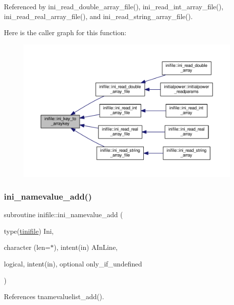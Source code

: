 Referenced by ini\+\_\+read\+\_\+double\+\_\+array\+\_\+file(), ini\+\_\+read\+\_\+int\+\_\+array\+\_\+file(), ini\+\_\+read\+\_\+real\+\_\+array\+\_\+file(), and ini\+\_\+read\+\_\+string\+\_\+array\+\_\+file().

Here is the caller graph for this function\+:
\nopagebreak
\begin{figure}[H]
\begin{center}
\leavevmode
\includegraphics[width=350pt]{namespaceinifile_a41a20dc9e9ec4315613c4e3c23108f2e_icgraph}
\end{center}
\end{figure}
\mbox{\label{namespaceinifile_a609f356a961dccd80c9ae97cef1ec582}} 
\subsubsection{\texorpdfstring{ini\+\_\+namevalue\+\_\+add()}{ini\_namevalue\_add()}}
{\footnotesize\ttfamily subroutine inifile\+::ini\+\_\+namevalue\+\_\+add (\begin{DoxyParamCaption}\item[{type(\mbox{\hyperlink{structinifile_1_1tinifile}{tinifile}})}]{Ini,  }\item[{character (len=$\ast$), intent(in)}]{A\+In\+Line,  }\item[{logical, intent(in), optional}]{only\+\_\+if\+\_\+undefined }\end{DoxyParamCaption})}



References tnamevaluelist\+\_\+add().



